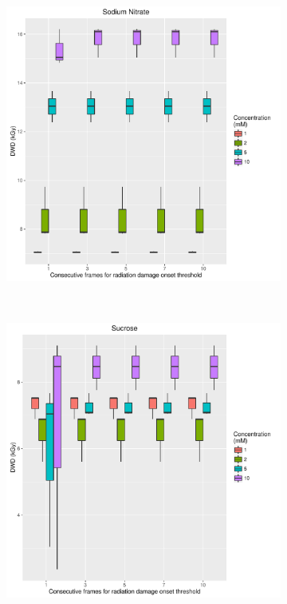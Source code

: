 \begin{figure}
    \ContinuedFloat
    \centering
    \begin{subfigure}[b]{0.75\textwidth}
            \centering
            \includegraphics[width=\textwidth]{figures/saxs/Sodium_Nitrate_Num_consec_fr_comp.pdf}
            \caption{}
            \label{}
    \end{subfigure}
    \\
    \begin{subfigure}[b]{0.75\textwidth}
            \centering
            \includegraphics[width=\textwidth]{figures/saxs/Sucrose_Num_consec_fr_comp.pdf}
            \caption{}
            \label{}
    \end{subfigure}
\end{figure}

